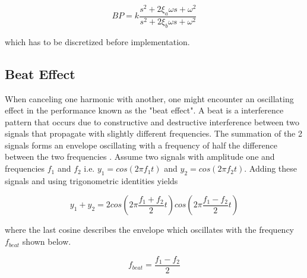 \begin{equation}
  \label{eq:bandpass}
  BP = k\frac{s^2 + 2\xi_a\omega s + \omega^2}{s^2 + 2\xi_b\omega s + \omega^2}
\end{equation}

which has to be discretized before implementation.

\subsection{Beat Effect}\label{subsec:beat}
When canceling one harmonic with another, one might encounter an oscillating effect in the performance known as the "beat effect".
A beat is a interference pattern that occurs due to constructive and destructive interference between two signals that propagate with slightly different frequencies. The summation of the 2 signals forms an envelope oscillating with a frequency of half the difference between the two frequencies \citep{beat:2016}. Assume two signals with amplitude one and frequencies $f_1$ and $f_2$ i.e. $y_1 = cos(2\pi f_1t)$ and $y_2 = cos(2\pi f_2t)$. Adding these signals and using trigonometric identities yields

\begin{equation}
  y_1 + y_2 = 2cos(2\pi\frac{f_1+f_2}{2}t)cos(2\pi\frac{f_1-f_2}{2}t)
\end{equation}

where the last cosine describes the envelope which oscillates with the frequency $f_{beat}$ shown below.

\begin{equation}
  f_{beat} = \frac{f_1-f_2}{2}
\end{equation}



